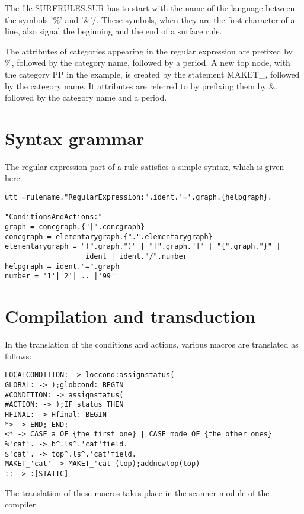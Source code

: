 The file SURFRULES.SUR has to start with the name of the language between the
symbols '\%' and '\&'/. These symbols, when they are the first character of a
line, also signal the beginning and the end of a surface rule.

The attributes of categories appearing in the regular expression are prefixed
by \%, followed by the category name, followed by a period. A new top node,
with the category PP in the example, is created by the statement MAKET\_,
followed by the category name. It attributes are referred to by prefixing them
by \&, followed by the category name and a period.

\section{Syntax grammar}
The regular expression part of a rule satisfies a simple syntax, which
is given here.
\begin{verbatim}
utt =rulename."RegularExpression:".ident.'='.graph.{helpgraph}.
                                                   "ConditionsAndActions:"
graph = concgraph.{"|".concgraph}
concgraph = elementarygraph.{".".elementarygraph}
elementarygraph = "(".graph.")" | "[".graph."]" | "{".graph."}" |
                   ident | ident."/".number
helpgraph = ident."=".graph
number = '1'|'2'| .. |'99'
\end{verbatim}
\section{Compilation and transduction}
In the translation of the conditions and actions, various macros are
translated as follows:
\begin{verbatim}
LOCALCONDITION: -> loccond:assignstatus(
GLOBAL: -> );globcond: BEGIN
#CONDITION: -> assignstatus(
#ACTION: -> );IF status THEN
HFINAL: -> Hfinal: BEGIN
*> -> END; END;
<* -> CASE a OF {the first one} | CASE mode OF {the other ones}
%'cat'. -> b^.ls^.'cat'field.
$'cat'. -> top^.ls^.'cat'field.
MAKET_'cat' -> MAKET_'cat'(top);addnewtop(top)
:: -> :[STATIC]
\end{verbatim}
The translation of these macros takes place in the scanner module of the
compiler.
